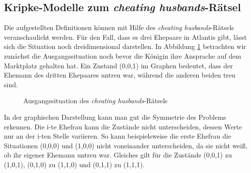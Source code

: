\subsection{Kripke-Modelle zum \textit{cheating husbands}-Rätsel}
Die aufgestellten Definitionen können mit Hilfe des \textit{cheating husbands}-Rätsels veranschaulicht werden.
Für den Fall, dass es drei Ehepaare in Atlantis gibt, lässt sich die Situation noch dreidimensional darstellen.
In Abbildung \ref{ausgang} betrachten wir zunächst die Ausgangssituation noch bevor die Königin ihre Ansprache auf dem Marktplatz gehalten hat.
Ein Zustand (0,0,1) im Graphen bedeutet, dass der Ehemann des dritten Ehepaares untreu war, während die anderen beiden treu sind.

\begin{figure}
\centering
{}
\caption{Ausgangssituation des \textit{cheating husbands}-Rätsels}
\label{ausgang}
\end{figure}

In der graphischen Darstellung kann man gut die Symmetrie des Problems erkennen.
Die i-te Ehefrau kann die Zustände nicht unterscheiden, dessen Werte nur an der i-ten Stelle variieren.
So kann beispielsweise die erste Ehefrau die Situationen (0,0,0) und (1,0,0) nicht voneinander unterscheiden, da sie nicht weiß, ob ihr eigener Ehemann untreu war. Gleiches gilt für die Zustände (0,0,1) zu (1,0,1), (0,1,0) zu (1,1,0) und (0,1,1) zu (1,1,1).\medskip

